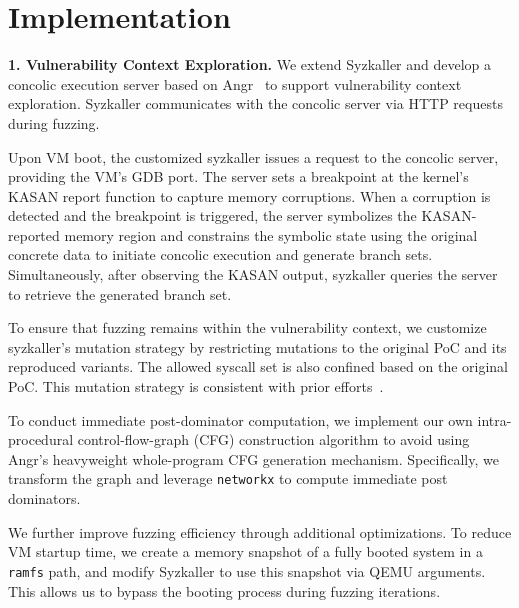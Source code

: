 \section{Implementation}
\noindent\textbf{1. Vulnerability Context Exploration.}  
We extend Syzkaller and develop a concolic execution server based on Angr~\cite{shoshitaishvili2016sok} to support vulnerability context exploration. Syzkaller communicates with the concolic server via HTTP requests during fuzzing.

Upon VM boot, the customized syzkaller issues a request to the concolic server, providing the VM’s GDB port. The server sets a breakpoint at the kernel's KASAN report function to capture memory corruptions. When a corruption is detected and the breakpoint is triggered, the server symbolizes the KASAN-reported memory region and constrains the symbolic state using the original concrete data to initiate concolic execution and generate branch sets. Simultaneously, after observing the KASAN output, syzkaller queries the server to retrieve the generated branch set.

To ensure that fuzzing remains within the vulnerability context, we customize syzkaller’s mutation strategy by restricting mutations to the original PoC and its reproduced variants. The allowed syscall set is also confined based on the original PoC. This mutation strategy is consistent with prior efforts~\cite{zou2022syzscope}.

To conduct immediate post-dominator computation, we implement our own intra-procedural control-flow-graph (CFG) construction algorithm to avoid using Angr's heavyweight whole-program CFG generation mechanism. Specifically, we transform the graph and leverage \texttt{networkx}\cite{hagberg2008exploring} to compute immediate post dominators.

We further improve fuzzing efficiency through additional optimizations. To reduce VM startup time, we create a memory snapshot of a fully booted system in a \texttt{ramfs} path, and modify Syzkaller to use this snapshot via QEMU arguments. This allows us to bypass the booting process during fuzzing iterations.


